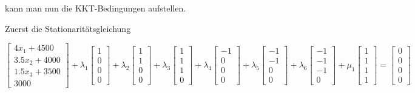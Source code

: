 \documentclass[a4paper, 12pt]{report}
\begin{document}
kann man nun die KKT-Bedingungen aufstellen.\par
Zuerst die Stationaritätsgleichung

\begin{adjustwidth}{-25pt}{0pt}
$$ \begin{bmatrix}4x_1 + 4500\\3.5x_2 + 4000\\1.5x_3 + 3500\\3000\end{bmatrix} + \lambda_1 \begin{bmatrix}1\\0\\0\\0\end{bmatrix} + \lambda_2 \begin{bmatrix}1\\1\\0\\0\end{bmatrix} + \lambda_3 \begin{bmatrix} 1\\1\\1\\0 \end{bmatrix} + \lambda_4 \begin{bmatrix}-1\\0\\0\\0\end{bmatrix} + \lambda_5 \begin{bmatrix} -1\\-1\\0\\0 \end{bmatrix} + \lambda_6 \begin{bmatrix}-1\\-1\\-1\\0\end{bmatrix} + \mu_1 \begin{bmatrix}1\\1\\1\\1\end{bmatrix} = \begin{bmatrix}0\\0\\0\\0\end{bmatrix} $$
\end{adjustwidth}
\end{document}
